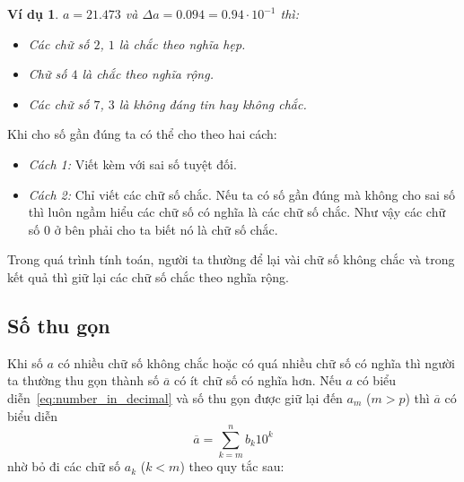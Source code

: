 \documentclass{book}
\newtheorem{exmp}{Ví dụ}[chapter]
\begin{document}
\begin{exmp}
    \(a = \num{21.473}\) và \(\Delta a = \num{0.094} = \num{0.94} \cdot
    10^{-1}\) thì:
    \begin{itemize}
        \item Các chữ số \(2\), \(1\) là chắc theo nghĩa hẹp.
        \item Chữ số \(4\) là chắc theo nghĩa rộng.
        \item Các chữ số \(7\), \(3\) là không đáng tin hay không chắc.
    \end{itemize}
\end{exmp}

Khi cho số gần đúng ta có thể cho theo hai cách:
\begin{itemize}
    \item \emph{Cách 1:} Viết kèm với sai số tuyệt đối.
    \item \emph{Cách 2:} Chỉ viết các chữ số chắc. Nếu ta có số gần đúng mà
        không cho sai số thì luôn ngầm hiểu các chữ số có nghĩa là các chữ số
        chắc. Như vậy các chữ số 0 ở bên phải cho ta biết nó là chữ số chắc.
\end{itemize}

Trong quá trình tính toán, người ta thường để lại vài chữ số không chắc và trong
kết quả thì giữ lại các chữ số chắc theo nghĩa rộng.

\subsection{Số thu gọn}

Khi số \(a\) có nhiều chữ số không chắc hoặc có quá nhiều chữ số có nghĩa thì
người ta thường thu gọn thành số \(\overline{a}\) có ít chữ số có nghĩa hơn. Nếu
\(a\) có biểu diễn~\ref{eq:number_in_decimal} và số thu gọn được giữ lại đến
\(a_m\) (\(m > p\)) thì \(\overline{a}\) có biểu diễn
\begin{equation}
    \overline{a} = \sum_{k=m}^{n} b_k 10^k
\end{equation}
nhờ bỏ đi các chữ số \(a_k\) (\(k < m\)) theo quy tắc sau:
\end{document}
